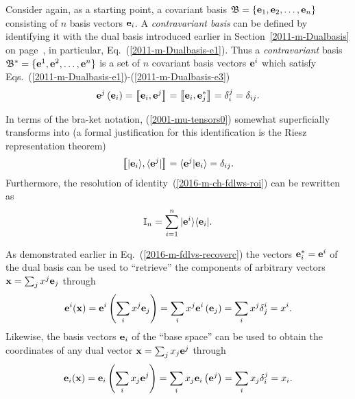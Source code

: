 Consider again, as a starting point, a covariant basis
${\mathfrak B}=\{{\bf e}_1,{\bf e}_2,\ldots ,{\bf e}_n\}$ consisting of
$n$ basis vectors ${\bf e}_i$.
A {\em contravariant basis} can be defined by identifying it with the dual basis
introduced earlier in Section~\ref{2011-m-Dualbasis} on page~\pageref{2011-m-Dualbasis},
in particular, Eq.~(\ref{2011-m-Dualbasis-e1}).
Thus a {\em contravariant} basis
${\mathfrak B^\ast}=\{{\bf e}^1,{\bf e}^2,\ldots ,{\bf e}^n\}$ is a set of $n$ covariant
basis vectors ${\bf e}^i$
which satisfy Eqs.~(\ref{2011-m-Dualbasis-e1})-(\ref{2011-m-Dualbasis-e3})
\begin{equation}
{\bf e}^j \left( {\bf e}_i \right) = \left\llbracket {\bf e}_i,{\bf e}^j \right\rrbracket  =  \left\llbracket {\bf e}_i,  {\bf e}_j^\ast \right\rrbracket
= \delta^j_i = \delta_{ij}
.
\label{2001-mu-tensors0}
\end{equation}

In terms of the bra-ket notation, (\ref{2001-mu-tensors0}) somewhat superficially transforms into
(a formal justification for this identification is the Riesz representation theorem)
\begin{equation}
\left\llbracket  \vert {\bf e}_i \rangle , \langle  {\bf e}^j \vert \right\rrbracket =
\langle  {\bf e}^j \vert {\bf e}_i \rangle =
  \delta_{ij}
.
\label{2001-mu-tensors0bk}
\end{equation}
Furthermore, the resolution of identity~(\ref{2016-m-ch-fdlws-roi}) can be rewritten as
\begin{equation}
 {\Bbb I}_n = \sum_{i=1}^n \vert {\bf e}^i \rangle \langle {\bf e}_i \vert
.
\label{2016-m-ch-tensor-roi}
\end{equation}

As demonstrated earlier in Eq.~(\ref{2016-m-fdlvs-recoverc}) the vectors ${\bf e}^\ast_i = {\bf e}^i$ of the dual basis can be used to ``retrieve'' the components of arbitrary vectors
${\bf x} = \sum_j x^j {\bf e}_j$  through
\begin{equation}
{\bf e}^i ( {\bf x} ) =
{\bf e}^i \left( \sum_i x^j {\bf e}_j \right) =
\sum_i  x^j {\bf e}^i \left({\bf e}_j \right) =
\sum_i  x^j \delta^i_j =
 x^i.
\label{2016-m-tensor-recoverc}
\end{equation}
Likewise, the basis vectors ${\bf e}_i$ of the ``base space'' can be used to obtain the coordinates of any dual vector ${\bf x} = \sum_j x_j {\bf e}^j$  through
\begin{equation}
{\bf e}_i ( {\bf x} ) =
{\bf e}_i \left( \sum_i x_j {\bf e}^j \right) =
\sum_i  x_j {\bf e}_i \left({\bf e}^j \right) =
\sum_i  x_j \delta_i^j =
 x_i.
\label{2016-m-tensor-recoverc2}
\end{equation}


